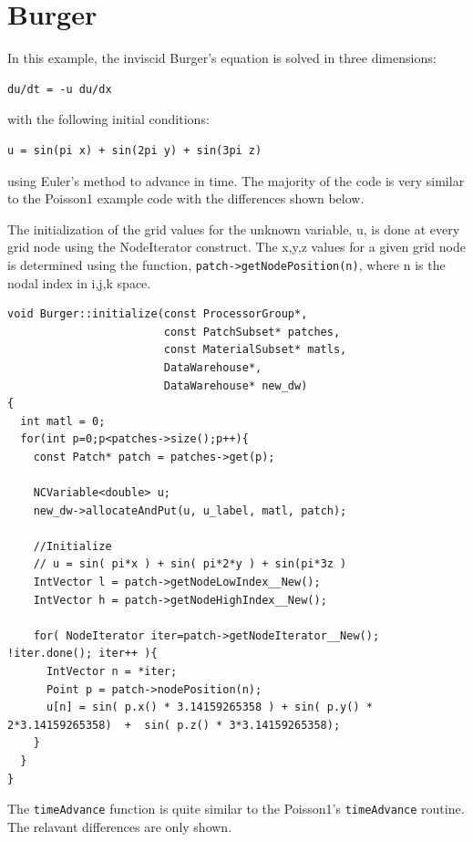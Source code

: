 \documentclass[12pt]{report}
\begin{document}
\section{Burger}

In this example, the inviscid Burger's equation is solved in three dimensions:
\begin{Verbatim}[fontsize=\footnotesize]
	du/dt = -u du/dx  
\end{Verbatim}

with the following initial conditions:

\begin{Verbatim}[fontsize=\footnotesize]
	u = sin(pi x) + sin(2pi y) + sin(3pi z)
\end{Verbatim}

using Euler's method to advance in time.  The majority of the code is
very similar to the Poisson1 example code with the differences shown
below.

The initialization of the grid values for the unknown variable, u, is
done at every grid node using the NodeIterator construct.  The x,y,z
values for a given grid node is determined using the function,
\texttt{patch->getNodePosition(n)}, where n is the nodal index in
i,j,k space.

\begin{Verbatim}[fontsize=\footnotesize]
void Burger::initialize(const ProcessorGroup*,
                        const PatchSubset* patches,
                        const MaterialSubset* matls,
                        DataWarehouse*, 
                        DataWarehouse* new_dw)
{
  int matl = 0;
  for(int p=0;p<patches->size();p++){
    const Patch* patch = patches->get(p);

    NCVariable<double> u;
    new_dw->allocateAndPut(u, u_label, matl, patch);

    //Initialize
    // u = sin( pi*x ) + sin( pi*2*y ) + sin(pi*3z )
    IntVector l = patch->getNodeLowIndex__New();
    IntVector h = patch->getNodeHighIndex__New();
    
    for( NodeIterator iter=patch->getNodeIterator__New(); !iter.done(); iter++ ){
      IntVector n = *iter;
      Point p = patch->nodePosition(n);
      u[n] = sin( p.x() * 3.14159265358 ) + sin( p.y() * 2*3.14159265358)  +  sin( p.z() * 3*3.14159265358);
    }
  }
}

\end{Verbatim}

The \texttt{timeAdvance} function is quite similar to the Poisson1's
\texttt{timeAdvance} routine.  The relavant differences are only
shown.
\end{document}

